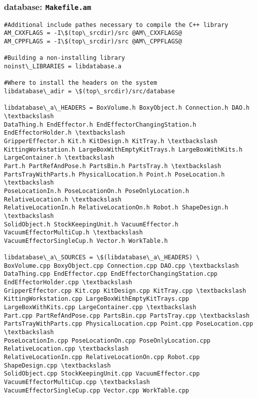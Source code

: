 \subsubsection{database: \texttt{Makefile.am}}
\begin{minipage}{.5\paperwidth}
\begin{mylisting}
\begin{Verbatim}[commandchars=\\\{\},fontsize=\scriptsize, numbersep=2pt]
#Additional include pathes necessary to compile the C++ library
AM_CXXFLAGS = -I\$(top\_srcdir)/src @AM\_CXXFLAGS@
AM_CPPFLAGS = -I\$(top\_srcdir)/src @AM\_CPPFLAGS@

#Building a non-installing library
noinst\_LIBRARIES = libdatabase.a

#Where to install the headers on the system
libdatabase\_adir = \$(top\_srcdir)/src/database

libdatabase\_a\_HEADERS = BoxVolume.h BoxyObject.h Connection.h DAO.h \textbackslash
DataThing.h EndEffector.h EndEffectorChangingStation.h EndEffectorHolder.h \textbackslash
GripperEffector.h Kit.h KitDesign.h KitTray.h \textbackslash
KittingWorkstation.h LargeBoxWithEmptyKitTrays.h LargeBoxWithKits.h LargeContainer.h \textbackslash
Part.h PartRefAndPose.h PartsBin.h PartsTray.h \textbackslash
PartsTrayWithParts.h PhysicalLocation.h Point.h PoseLocation.h \textbackslash
PoseLocationIn.h PoseLocationOn.h PoseOnlyLocation.h RelativeLocation.h \textbackslash
RelativeLocationIn.h RelativeLocationOn.h Robot.h ShapeDesign.h \textbackslash
SolidObject.h StockKeepingUnit.h VacuumEffector.h VacuumEffectorMultiCup.h \textbackslash
VacuumEffectorSingleCup.h Vector.h WorkTable.h

libdatabase\_a\_SOURCES = \$(libdatabase\_a\_HEADERS) \
BoxVolume.cpp BoxyObject.cpp Connection.cpp DAO.cpp \textbackslash
DataThing.cpp EndEffector.cpp EndEffectorChangingStation.cpp EndEffectorHolder.cpp \textbackslash
GripperEffector.cpp Kit.cpp KitDesign.cpp KitTray.cpp \textbackslash
KittingWorkstation.cpp LargeBoxWithEmptyKitTrays.cpp LargeBoxWithKits.cpp LargeContainer.cpp \textbackslash
Part.cpp PartRefAndPose.cpp PartsBin.cpp PartsTray.cpp \textbackslash
PartsTrayWithParts.cpp PhysicalLocation.cpp Point.cpp PoseLocation.cpp \textbackslash
PoseLocationIn.cpp PoseLocationOn.cpp PoseOnlyLocation.cpp RelativeLocation.cpp \textbackslash
RelativeLocationIn.cpp RelativeLocationOn.cpp Robot.cpp ShapeDesign.cpp \textbackslash
SolidObject.cpp StockKeepingUnit.cpp VacuumEffector.cpp VacuumEffectorMultiCup.cpp \textbackslash
VacuumEffectorSingleCup.cpp Vector.cpp WorkTable.cpp
\end{Verbatim}
\end{mylisting}
\end{minipage}

